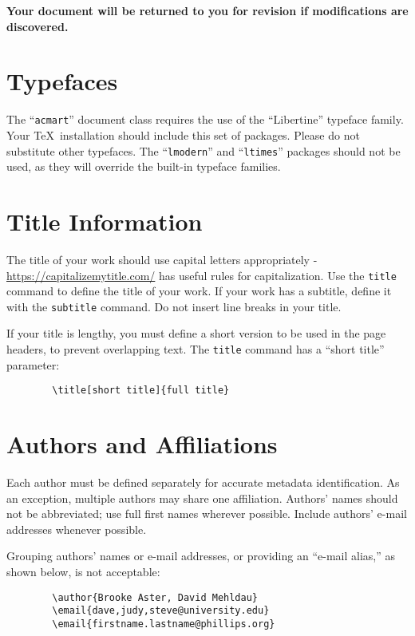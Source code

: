 \documentclass[acmsmall]{acmart}
\begin{document}
	{\bfseries Your document will be returned to you for revision if
		modifications are discovered.}
	
	\section{Typefaces}
	
	The ``\verb|acmart|'' document class requires the use of the
	``Libertine'' typeface family. Your \TeX\ installation should include
	this set of packages. Please do not substitute other typefaces. The
	``\verb|lmodern|'' and ``\verb|ltimes|'' packages should not be used,
	as they will override the built-in typeface families.
	
	\section{Title Information}
	
	The title of your work should use capital letters appropriately -
	\url{https://capitalizemytitle.com/} has useful rules for
	capitalization. Use the {\verb|title|} command to define the title of
	your work. If your work has a subtitle, define it with the
	{\verb|subtitle|} command.  Do not insert line breaks in your title.
	
	If your title is lengthy, you must define a short version to be used
	in the page headers, to prevent overlapping text. The \verb|title|
	command has a ``short title'' parameter:
	\begin{verbatim}
		\title[short title]{full title}
	\end{verbatim}
	
	\section{Authors and Affiliations}
	
	Each author must be defined separately for accurate metadata
	identification.  As an exception, multiple authors may share one
	affiliation. Authors' names should not be abbreviated; use full first
	names wherever possible. Include authors' e-mail addresses whenever
	possible.
	
	Grouping authors' names or e-mail addresses, or providing an ``e-mail
	alias,'' as shown below, is not acceptable:
	\begin{verbatim}
		\author{Brooke Aster, David Mehldau}
		\email{dave,judy,steve@university.edu}
		\email{firstname.lastname@phillips.org}
	\end{verbatim}
	
\end{document}
